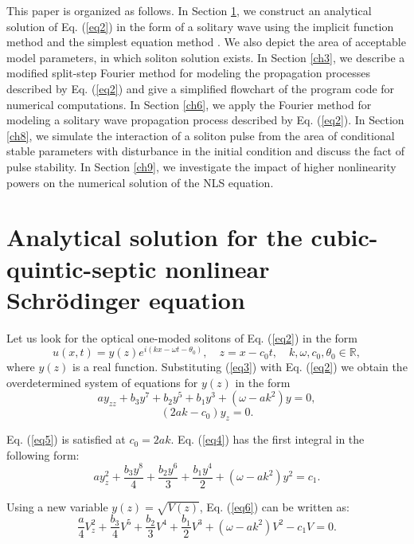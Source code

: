 \documentclass[preprint,12pt]{elsarticle}
\begin{document}
This paper is organized as follows.
In Section \ref{ch2}, we construct an analytical solution of Eq. (\ref{eq2}) in the form of a solitary wave using the implicit function method and the simplest equation method \cite{Rad4}. We also depict the area of acceptable model parameters, in which soliton solution exists. In Section \ref{ch3}, we describe a modified split-step Fourier method for modeling the propagation processes described by Eq. (\ref{eq2}) and give a simplified flowchart of the program code for numerical computations. In Section \ref{ch6}, we apply the Fourier method for modeling a solitary wave propagation process described by Eq. (\ref{eq2}). In Section \ref{ch8}, we simulate the interaction of a soliton pulse from the area of conditional stable parameters with disturbance in the initial condition and discuss the fact of pulse stability. In Section \ref{ch9}, we investigate the impact of higher nonlinearity powers on the numerical solution of the NLS equation.

\section{Analytical solution for the cubic-quintic-septic nonlinear Schr\"{o}dinger equation}\label{ch2}
Let us look for the optical one-moded solitons of Eq. (\ref{eq2}) in the form
\begin{equation}\label{eq3}
u(x,t)=y(z)e^{i(kx-\omega t-\theta_{0})}, \quad z=x-c_{0}t,\quad k,\omega,c_{0},\theta_{0} \in \mathbb{R},
\end{equation}
where \(y(z)\) is a real function. Substituting (\ref{eq3}) with Eq. (\ref{eq2}) we obtain the overdetermined system of equations for \(y(z)\) in the form
\begin{equation} \label{eq4}
a y_{zz}+b_{3} y^{7} +b_{2} y^{5} + b_{1} y^{3}+\left(\omega-ak^{2}\right) y=0,
\end{equation}
\begin{equation} \label{eq5}
(2 a k-c_{0})y_{z}=0.
\end{equation}

Eq. (\ref{eq5}) is satisfied at \(c_{0}=2ak\). Eq. (\ref{eq4}) has the first integral in the following form:
\begin{equation} \label{eq6}
ay_{z}^{2}+\frac{b_{3} y^{8} }{4}+\frac{b_{2} y^{6} }{3}+\frac{b_{1} y^{4} }{2}+\left(\omega-ak^{2}\right) y^{2} =c_{1}.
\end{equation}

Using a new variable \(y(z)=\sqrt{V(z)}\), Eq. (\ref{eq6}) can be written as:
\begin{equation} \label{eq7}
\frac{ a}{4}V_{z}^{2}+\frac{b_{3}}{4}V^{5} +\frac{b_{2}}{3}V^{4} +\frac{b_{1}}{2}V^{3}+\left( \omega- ak^{2}\right)V^{2}-c_{1} V=0.
\end{equation}
\end{document}

